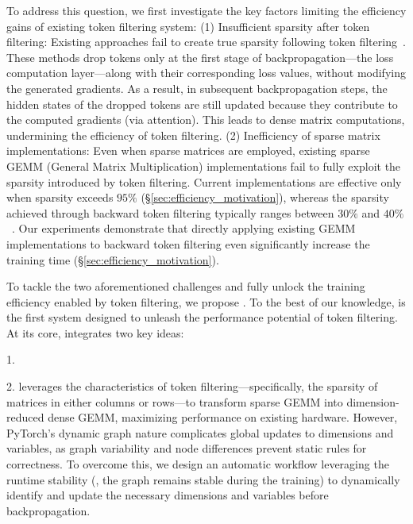 To address this question, we first investigate the key factors limiting the efficiency gains of existing token filtering system: (1) Insufficient sparsity after token filtering: Existing approaches fail to create true sparsity following token filtering~\cite{RHO}. These methods drop tokens only at the first stage of backpropagation---the loss computation layer---along with their corresponding loss values, without modifying the generated gradients. As a result, in subsequent backpropagation steps, the hidden states of the dropped tokens are still updated because they contribute to the computed gradients (via attention). This leads to dense matrix computations, undermining the efficiency of token filtering. (2) Inefficiency of sparse matrix implementations: Even when sparse matrices are employed, existing sparse GEMM (General Matrix Multiplication) implementations fail to fully exploit the sparsity introduced by token filtering. Current implementations are effective only when sparsity exceeds $95\%$ (\S\ref{sec:efficiency_motivation}), whereas the sparsity achieved through backward token filtering typically ranges between $30\%$ and $40\%$~\cite{RHO}. Our experiments demonstrate that directly applying existing GEMM implementations to backward token filtering even significantly increase the training time (\S\ref{sec:efficiency_motivation}).

To tackle the two aforementioned challenges and fully unlock the training efficiency enabled by token filtering, we propose \solution. To the best of our knowledge, \solution is the first system designed to unleash the performance potential of token filtering. At its core, \solution integrates two key ideas:
\begin{icompact}
\item[1.] 
\item[2.] \solution leverages the characteristics of token filtering—specifically, the sparsity of matrices in either columns or rows—to transform sparse GEMM into dimension-reduced dense GEMM, maximizing performance on existing hardware. However, PyTorch's dynamic graph nature complicates global updates to dimensions and variables, as graph variability and node differences prevent static rules for correctness. To overcome this, we design an automatic workflow leveraging the runtime stability (\ie, the graph remains stable during the training) to dynamically identify and update the necessary dimensions and variables before backpropagation.
\end{icompact}

